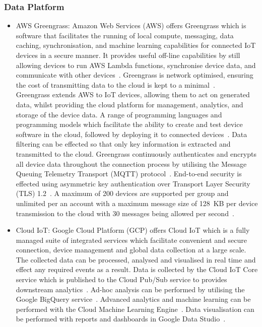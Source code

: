 \documentclass[10pt,twocolumn]{witseiepaper}
\begin{document}
		\subsubsection{Data Platform}
			\begin{itemize}
				\item AWS Greengrass:
				Amazon Web Services (AWS) offers Greengrass which is software that facilitates the running of local compute, messaging, data caching, synchronisation, and machine learning capabilities for connected IoT devices in a secure manner. It provides useful off-line capabilities by still allowing devices to run AWS Lambda functions, synchronise device data, and communicate with other devices~\cite{greengrass}. Greengrass is network optimised, ensuring the cost of transmitting data to the cloud is kept to a minimal~\cite{greengrass}.\\
				
				Greengrass extends AWS to IoT devices, allowing them to act on generated data, whilst providing the cloud platform for management, analytics, and storage of the device data. A range of programming languages and programming models which facilitate the ability to create and test device software in the cloud, followed by deploying it to connected devices~\cite{greengrass}. Data filtering can be effected so that only key information is extracted and transmitted to the cloud. Greengrass continuously authenticates and encrypts all device data throughout the connection process by utilising the Message Queuing Telemetry Transport (MQTT) protocol~\cite{greengrass}. End-to-end security is effected using asymmetric key authentication over Transport Layer Security (TLS) 1.2~\cite{greengrass}. A maximum of 200 devices are supported per group and unlimited per an account with a maximum message size of 128~KB per device transmission to the cloud with 30 messages being allowed per second~\cite{aws-quota}.\\
				
				\item Cloud IoT:
				Google Cloud Platform (GCP) offers Cloud IoT which is a fully managed suite of integrated services which facilitate convenient and secure connection, device management and global data collection at a large scale. The collected data can be processed, analysed and visualised in real time and effect any required events as a result. Data is collected by the Cloud IoT Core service which is published to the Cloud Pub/Sub service to provides downstream analytics~\cite{cloud-iot}. Ad-hoc analysis can be performed by utilising the Google BigQuery service~\cite{cloud-iot}. Advanced analytics and machine learning can be performed with the Cloud Machine Learning Engine~\cite{cloud-iot}. Data visualisation can be performed with reports and dashboards in Google Data Studio~\cite{cloud-iot}.\\
				

\end{itemize}
\end{document}
